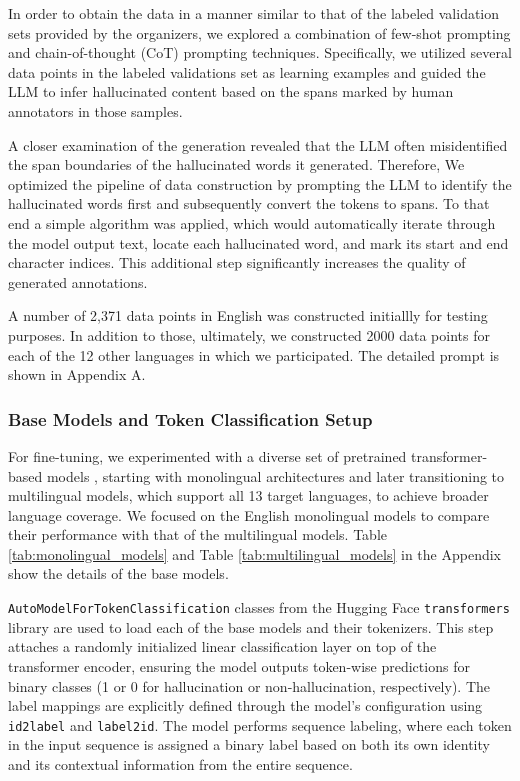 \documentclass[11pt]{article}
\begin{document}
In order to obtain the data in a manner similar to that of the labeled validation sets provided by the organizers, we explored a combination of few-shot prompting and chain-of-thought (CoT) prompting techniques. Specifically, we utilized several data points in the labeled validations set as learning examples and guided the LLM to infer hallucinated content based on the spans marked by human annotators in those samples. 

A closer examination of the generation revealed that the LLM often misidentified the span boundaries of the hallucinated words it generated. Therefore, We optimized the pipeline of data construction by prompting the LLM to identify the hallucinated words first and subsequently convert the tokens to spans. To that end a simple algorithm was applied, which would automatically iterate through the model output text, locate each hallucinated word, and mark its start and end character indices. This additional step significantly increases the quality of generated annotations. 

A number of 2,371 data points in English was constructed initiallly for testing purposes. In addition to those, ultimately, we constructed 2000 data points for each of the 12 other languages in which we participated. The detailed prompt is shown in Appendix A.


\subsubsection{Base Models and Token Classification Setup}
For fine-tuning, we experimented with a diverse set of pretrained transformer-based models \cite{vaswani2017attention}, starting with monolingual architectures and later transitioning to multilingual models, which support all 13 target languages, to achieve broader language coverage. We focused on the English monolingual models to compare their performance with that of the multilingual models. Table \ref{tab:monolingual_models} and Table \ref{tab:multilingual_models} in the Appendix show the details of the base models.

\texttt{AutoModelForTokenClassification} classes from the Hugging Face \texttt{transformers} library \cite{wolf-etal-2020-transformers} are used to load each of the base models and their tokenizers. This step attaches a randomly initialized linear classification layer on top of the transformer encoder, ensuring the model outputs token-wise predictions for binary classes (1 or 0 for hallucination or non-hallucination, respectively). The label mappings are explicitly defined through the model's configuration using \texttt{id2label} and \texttt{label2id}. The model performs sequence labeling, where each token in the input sequence is assigned a binary label based on both its own identity and its contextual information from the entire sequence.
\end{document}

